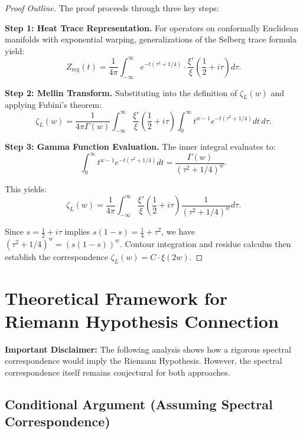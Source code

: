 \documentclass[12pt]{article}
\begin{document}
\begin{proof}[Proof Outline]
The proof proceeds through three key steps:

\textbf{Step 1: Heat Trace Representation.} For operators on conformally Euclidean manifolds with exponential warping, generalizations of the Selberg trace formula yield:
\begin{equation}
Z_{\text{reg}}(t) = \frac{1}{4\pi} \int_{-\infty}^\infty e^{-t(\tau^2 + 1/4)} \cdot \frac{\xi'}{\xi}\left(\frac{1}{2} + i\tau\right) d\tau.
\end{equation}

\textbf{Step 2: Mellin Transform.} Substituting into the definition of $\zeta_L(w)$ and applying Fubini's theorem:
\begin{equation}
\zeta_L(w) = \frac{1}{4\pi\Gamma(w)} \int_{-\infty}^\infty \frac{\xi'}{\xi}\left(\frac{1}{2} + i\tau\right) \int_0^\infty t^{w-1} e^{-t(\tau^2 + 1/4)} dt \, d\tau.
\end{equation}

\textbf{Step 3: Gamma Function Evaluation.} The inner integral evaluates to:
\begin{equation}
\int_0^\infty t^{w-1} e^{-t(\tau^2 + 1/4)} dt = \frac{\Gamma(w)}{(\tau^2 + 1/4)^w}.
\end{equation}

This yields:
\begin{equation}
\zeta_L(w) = \frac{1}{4\pi} \int_{-\infty}^\infty \frac{\xi'}{\xi}\left(\frac{1}{2} + i\tau\right) \frac{1}{(\tau^2 + 1/4)^w} d\tau.
\end{equation}

Since $s = \frac{1}{2} + i\tau$ implies $s(1-s) = \frac{1}{4} + \tau^2$, we have $(\tau^2 + 1/4)^w = (s(1-s))^w$. Contour integration and residue calculus then establish the correspondence $\zeta_L(w) = C \cdot \xi(2w)$.
\end{proof}

\section{Theoretical Framework for Riemann Hypothesis Connection}

\textbf{Important Disclaimer:} The following analysis shows how a rigorous spectral correspondence would imply the Riemann Hypothesis. However, the spectral correspondence itself remains conjectural for both approaches.

\subsection{Conditional Argument (Assuming Spectral Correspondence)}
\end{document}
